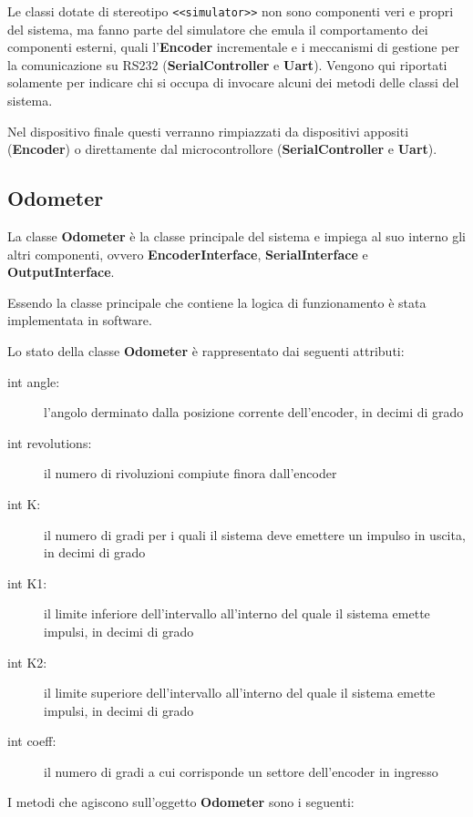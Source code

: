 \documentclass [11pt,a4paper,oneside]{paper}
\newcommand{\component}[1]{\textbf{#1}}
\newcommand{\identifier}[1]{\texttt{#1}}
\begin{document}
Le classi dotate di stereotipo \identifier{<<simulator>>} non sono
componenti veri e propri del sistema, ma fanno parte del simulatore
che emula il comportamento dei componenti esterni, quali
l'\component{Encoder} incrementale e i meccanismi di gestione per la
comunicazione su RS232 (\component{SerialController} e \component{Uart}).
Vengono qui riportati solamente per indicare chi si occupa di invocare
alcuni dei metodi delle classi del sistema.

Nel dispositivo finale questi verranno rimpiazzati da dispositivi appositi
(\component{Encoder}) o direttamente dal microcontrollore
(\component{SerialController} e \component{Uart}).

\subsection{Odometer}
La classe \component{Odometer} è la classe principale del sistema e
impiega al suo interno gli altri componenti, ovvero 
\component{EncoderInterface}, \component{SerialInterface} e
\component{OutputInterface}.

Essendo la classe principale che contiene la logica di funzionamento
è stata implementata in software.

Lo stato della classe \component{Odometer} è rappresentato
dai seguenti attributi:

\begin{description}
\item[int angle:] l'angolo derminato dalla posizione corrente dell'encoder,
     in decimi di grado
\item[int revolutions:] il numero di rivoluzioni compiute finora dall'encoder
\item[int K:] il numero di gradi per i quali il sistema deve emettere un
     impulso in uscita, in decimi di grado
\item[int K1:] il limite inferiore dell'intervallo all'interno del quale
     il sistema emette impulsi, in decimi di grado
\item[int K2:] il limite superiore dell'intervallo all'interno del quale
     il sistema emette impulsi, in decimi di grado
\item[int coeff:] il numero di gradi a cui corrisponde un settore
     dell'encoder in ingresso
\end{description}

I metodi che agiscono sull'oggetto \component{Odometer} sono i seguenti:
\end{document}
